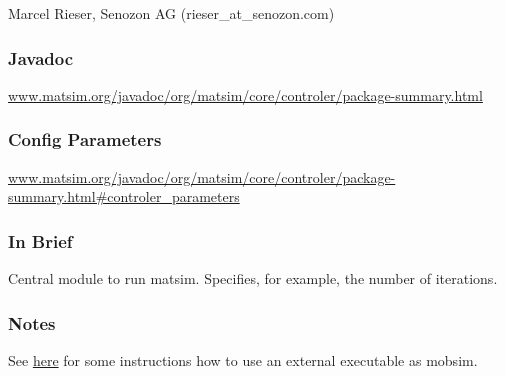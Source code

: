 Marcel Rieser, Senozon AG (rieser\_at\_senozon.com)

\subsubsection{\textbf{Javadoc}}

\href{http://www.matsim.org/javadoc/org/matsim/core/controler/package-summary.html}{www.matsim.org/javadoc/org/matsim/core/controler/package-summary.html}



\subsubsection{Config Parameters}

\href{http://www.matsim.org/javadoc/org/matsim/core/controler/package-summary.html#controler_parameters}{www.matsim.org/javadoc/org/matsim/core/controler/package-summary.html\#controler\_parameters}


\subsubsection{\textbf{\textbf{In Brief}}}

Central module to run matsim. Specifies, for example, the number of iterations.



\subsubsection{Notes}

See \href{http://matsim.org/node/398}{here} for some instructions how to use an external executable as mobsim.

\vfill\eject





